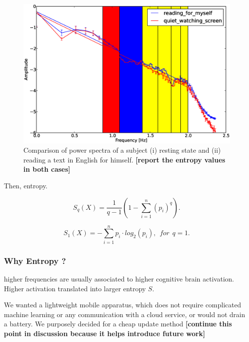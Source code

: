 \begin{figure}[!t]
\centering
\includegraphics[width=0.9\columnwidth]{../figures/compare_pSpectra.eps}
\caption{Comparison of power spectra of a subject (i) resting state and (ii) reading a text in English for himself. {\bf [report the entropy values in both cases]}}
\label{fig:pspectrum}
\end{figure}


Then, entropy.

\begin{equation}
\label{eq:tsallis}
S_q(X) = \frac{1}{q-1} \left( 1 - \sum_{i=1}^n (p_i)^q \right).
\end{equation}

\begin{equation}
\label{eq:shannon}
S_1(X) = - \sum_{i=1}^n p_i\cdot log_{2}(p_i), ~~for~~q=1.
\end{equation}

\subsubsection{Why Entropy ?}

higher frequencies are usually associated to higher cognitive brain activation. Higher activation  translated into larger entropy $S$.


We wanted a lightweight mobile apparatus, which does not require complicated machine learning or any communication with a cloud service, or would not drain a battery. We purposely decided for a cheap update method {\bf [continue this point in discussion because it helps introduce future work]}

